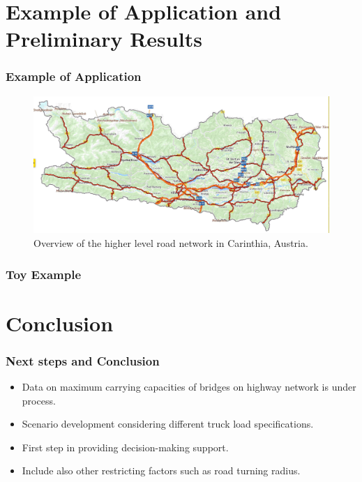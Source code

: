 \documentclass{beamer}   %
\theoremstyle{break}
\begin{document}
  \section[Example of Application] {Example of Application and Preliminary Results}
  \begin{frame}
    \frametitle{Example of Application}
    \begin{figure}[!ht]
      \centering
      \includegraphics[width=1.0\textwidth]{../manuscript/figures/map.jpg}
      \caption{Overview of the higher level road network in Carinthia, Austria.}
      \label{fig:higher level}
    \end{figure}
  \end{frame}





  \begin{frame}
    \frametitle{Toy Example}
    \begin{figure}[!ht]
      \centering
      \scalebox{0.5}{
      
      }
    \end{figure}
  \end{frame}


  \section[Next Steps and Conclusion] {Conclusion}

  \begin{frame}
    \frametitle{Next steps and Conclusion}
    \begin{itemize}
      \item Data on maximum carrying capacities of bridges on highway network is under process.
      \item Scenario development considering different truck load specifications.
	\item First step in providing decision-making support. 
	\item Include also other restricting factors such as road turning radius. 
    \end{itemize}

  \end{frame}
\end{document}
